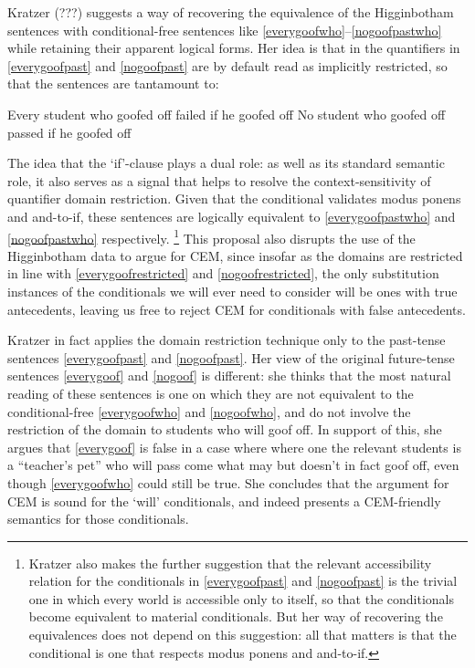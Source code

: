 \documentclass[If.tex]{subfiles}
\begin{document}
Kratzer (???) suggests a way of recovering the equivalence of the Higginbotham sentences with conditional-free sentences like \ref{everygoofwho}--\ref{nogoofpastwho} while retaining their apparent logical forms. Her idea is that in the quantifiers in \ref{everygoofpast} and \ref{nogoofpast} are by default read as implicitly restricted, so that the sentences are tantamount to:
\begin{prop}
\nitem \label{everygoofrestricted}
  Every student who goofed off failed if he goofed off
\nitem \label{nogoofrestricted}
  No student who goofed off passed if he goofed off
\end{prop}
The idea that the ‘if’-clause plays a dual role: as well as its standard semantic role, it also serves as a signal that helps to resolve the context-sensitivity of quantifier domain restriction. Given that the conditional validates modus ponens and and-to-if, these sentences are logically equivalent to \ref{everygoofpastwho}
and \ref{nogoofpastwho} respectively.%
\footnote{Kratzer also makes the further suggestion that the relevant accessibility relation for the conditionals in \ref{everygoofpast} and \ref{nogoofpast} is the trivial one in which every world is accessible only to itself, so that the conditionals become equivalent to material conditionals. But her way of recovering the equivalences does not depend on this suggestion: all that matters is that the conditional is one that respects modus ponens and and-to-if.}
This proposal also disrupts the use of the Higginbotham data to argue for CEM, since insofar as the domains are restricted in line with \ref{everygoofrestricted} and \ref{nogoofrestricted}, the only substitution instances of the conditionals we will ever need to consider will be ones with true antecedents, leaving us free to reject CEM for conditionals with false antecedents.

Kratzer in fact applies the domain restriction technique only to the past-tense sentences \ref{everygoofpast} and \ref{nogoofpast}. Her view of the original future-tense sentences \ref{everygoof} and \ref{nogoof} is different: she thinks that the most natural reading of these sentences is one on which they are not equivalent to the conditional-free \ref{everygoofwho} and \ref{nogoofwho}, and do not involve the restriction of the domain to students who will goof off. In support of this, she argues that \ref{everygoof} is false in a case where where one the relevant students is a ``teacher's pet'' who will pass come what may but doesn't in fact goof off, even though \ref{everygoofwho} could still be true. She concludes that the argument for CEM is sound for the ‘will’ conditionals, and indeed presents a CEM-friendly semantics for those conditionals.
\end{document}
